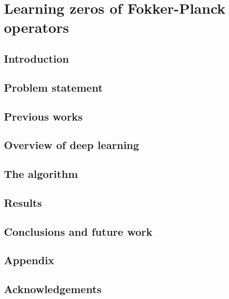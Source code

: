\chapter{Learning zeros of Fokker-Planck operators}
\section{Introduction}\label{sec-intro--steady-fp}

\section{Problem statement}
\label{sec-prob--steady-fp}

\section{Previous works}\label{sec-prev-work--steady-fp}

\section{Overview of deep learning}
\label{sec-learning--steady-fp}


\section{The algorithm}
\label{sec-algo--steady-fp}

\section{Results}\label{sec-steady-res--steady-fp}



\section{Conclusions and future work}
\label{sec-conclusions--steady-fp}


\section{Appendix}
\label{sec-appendix--steady-fp}


\section*{Acknowledgements}




